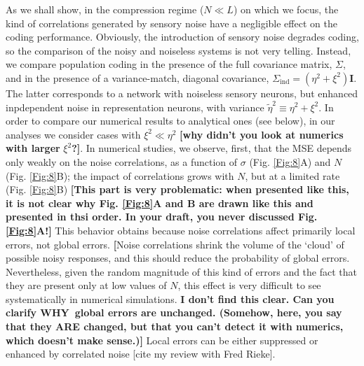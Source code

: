 \documentclass[a4paper]{article}%
\begin{document}
As we shall show, in the compression regime ($N\ll L$) on which we focus, the
kind of correlations generated by sensory noise have a negligible effect on
the coding performance. Obviously, the introduction of sensory noise degrades
coding, so the comparison of the noisy and noiseless systems is not very
telling. Instead, we compare population coding in the presence of the full
covariance matrix, $\Sigma$, and in the presence of a variance-match, diagonal
covariance, $\Sigma_{\text{ind}}=(\eta^{2}+\xi^{2})\mathbf{I}$. The latter
corresponds to a network with noiseless sensory neurons, but enhanced
inpdependent noise in representation neurons, with variance $\tilde{\eta}%
^{2}\equiv\eta^{2}+\xi^{2}$. In order to compare our numerical results to
analytical ones (see below), in our analyses we  consider cases with $\xi
^{2}\ll\eta^{2}$\textbf{ [why didn't you look at numerics with larger }%
$\xi^{2}$\textbf{?]}. In numerical studies, we observe, first, that the MSE
depends only weakly on the noise correlations, as a function of $\sigma$ (Fig.
\ref{Fig:8}A) and $N$ (Fig. \ref{Fig:8}B); the impact of correlations grows
with $N$, but at a limited rate (Fig. \ref{Fig:8}B) \textbf{[This part is very
problematic: when presented like this, it is not clear why Fig. \ref{Fig:8}A
and B are drawn like this and presented in thsi order. In your draft, you
never discussed Fig. \ref{Fig:8}A!]} This behavior obtains because noise
correlations affect primarily local errors, not global errors. \textbf{[}Noise
correlations shrink the volume of the `cloud' of possible noisy responses, and
this should reduce the probability of global errors. Nevertheless, given the
random magnitude of this kind of errors and the fact that they are present
only at low values of $N$, this effect is very difficult to see systematically
in numerical simulations. \textbf{I don't find this clear. Can you clarify
WHY\ global errors are unchanged. (Somehow, here, you say that they ARE
changed, but that you can't detect it with numerics, which doesn't make
sense.)]} Local errors can be either suppressed or enhanced by correlated
noise [cite my review with Fred Rieke].
\end{document}
